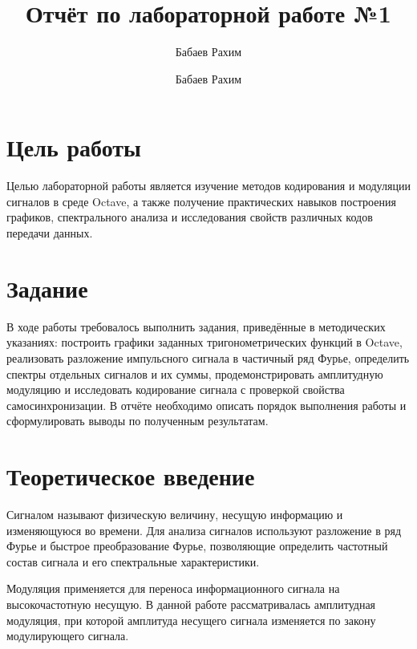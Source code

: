 \documentclass[
  english,
  russian,
  12pt,
  a4paper,
  DIV=11,
  numbers=noendperiod]{scrreprt}
\title{Отчёт по лабораторной работе №1}
\subtitle{Бабаев Рахим}
\author{Бабаев Рахим}
\date{}
\renewcommand*\contentsname{Содержание}
\newcommand\contentsname{Содержание}
\begin{document}
\maketitle

\renewcommand*\contentsname{Содержание}
{
\setcounter{tocdepth}{1}
\tableofcontents
}
\listoffigures
\listoftables

\chapter{Цель
работы}\label{ux446ux435ux43bux44c-ux440ux430ux431ux43eux442ux44b}

Целью лабораторной работы является изучение методов кодирования и
модуляции сигналов в среде Octave, а также получение практических
навыков построения графиков, спектрального анализа и исследования
свойств различных кодов передачи данных.

\chapter{Задание}\label{ux437ux430ux434ux430ux43dux438ux435}

В ходе работы требовалось выполнить задания, приведённые в методических
указаниях: построить графики заданных тригонометрических функций в
Octave, реализовать разложение импульсного сигнала в частичный ряд
Фурье, определить спектры отдельных сигналов и их суммы,
продемонстрировать амплитудную модуляцию и исследовать кодирование
сигнала с проверкой свойства самосинхронизации. В отчёте необходимо
описать порядок выполнения работы и сформулировать выводы по полученным
результатам.

\chapter{Теоретическое
введение}\label{ux442ux435ux43eux440ux435ux442ux438ux447ux435ux441ux43aux43eux435-ux432ux432ux435ux434ux435ux43dux438ux435}

Сигналом называют физическую величину, несущую информацию и изменяющуюся
во времени. Для анализа сигналов используют разложение в ряд Фурье и
быстрое преобразование Фурье, позволяющие определить частотный состав
сигнала и его спектральные характеристики.

Модуляция применяется для переноса информационного сигнала на
высокочастотную несущую. В данной работе рассматривалась амплитудная
модуляция, при которой амплитуда несущего сигнала изменяется по закону
модулирующего сигнала.
\end{document}

